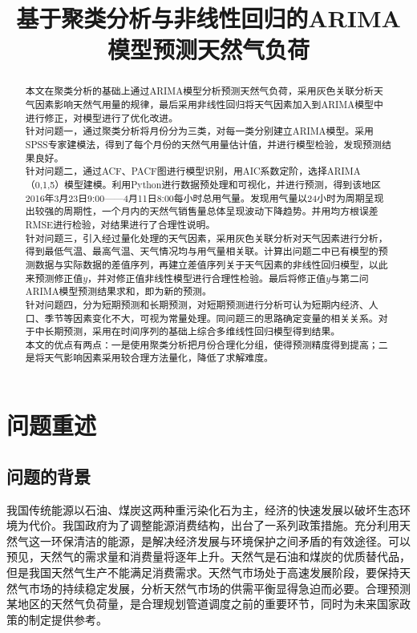 \documentclass{whutmod}
\title{基于聚类分析与非线性回归的ARIMA模型预测天然气负荷}
\begin{document}
	
	\maketitle
	
	\begin{abstract}
   本文在聚类分析的基础上通过ARIMA模型分析预测天然气负荷，采用灰色关联分析天气因素影响天然气用量的规律，最后采用非线性回归将天气因素加入到ARIMA模型中进行修正，对模型进行了优化改进。
~\\

   针对问题一，通过聚类分析将月份分为三类，对每一类分别建立ARIMA模型。采用SPSS专家建模法，得到了每个月份的天然气用量估计值，并进行模型检验，发现预测结果良好。
~\\

   针对问题二，通过ACF、PACF图进行模型识别，用AIC系数定阶，选择ARIMA（0,1,5）模型建模。利用Python进行数据预处理和可视化，并进行预测，得到该地区2016年3月23日9:00——4月11日8:00每小时总用气量。发现用气量以24小时为周期呈现出较强的周期性，一个月内的天然气销售量总体呈现波动下降趋势。并用均方根误差RMSE进行检验，对结果进行了合理性说明。
~\\

   针对问题三，引入经过量化处理的天气因素，采用灰色关联分析对天气因素进行分析，得到最低气温、最高气温、天气情况均与用气量相关联。计算出问题二中已有模型的预测数据与实际数据的差值序列，再建立差值序列关于天气因素的非线性回归模型，以此来预测修正值$y$，并对修正值非线性模型进行合理性检验。最后将修正值$y$与第二问ARIMA模型预测结果求和，即为新的预测。
~\\

   针对问题四，分为短期预测和长期预测，对短期预测进行分析可认为短期内经济、人口、季节等因素变化不大，可视为常量处理。同问题三的思路确定变量的相关关系。对于中长期预测，采用在时间序列的基础上综合多维线性回归模型得到结果。
~\\

   本文的优点有两点：一是使用聚类分析把月份合理化分组，使得预测精度得到提高；二是将天气影响因素采用较合理方法量化，降低了求解难度。


	
		
	\end{abstract}
	
	\tableofcontents
	\newpage	%
	
	\section{问题重述}
	\subsection{问题的背景}
		我国传统能源以石油、煤炭这两种重污染化石为主，经济的快速发展以破坏生态环境为代价。我国政府为了调整能源消费结构，出台了一系列政策措施。充分利用天然气这一环保清洁的能源，是解决经济发展与环境保护之间矛盾的有效途径。可以预见，天然气的需求量和消费量将逐年上升。天然气是石油和煤炭的优质替代品，但是我国天然气生产不能满足消费需求\parencite{鞠武2014中国天然气市场供需趋势研究}。天然气市场处于高速发展阶段，要保持天然气市场的持续稳定发展，分析天然气市场的供需平衡显得急迫而必要。合理预测某地区的天然气负荷量，是合理规划管道调度之前的重要环节，同时为未来国家政策的制定提供参考。
	
\end{document}
